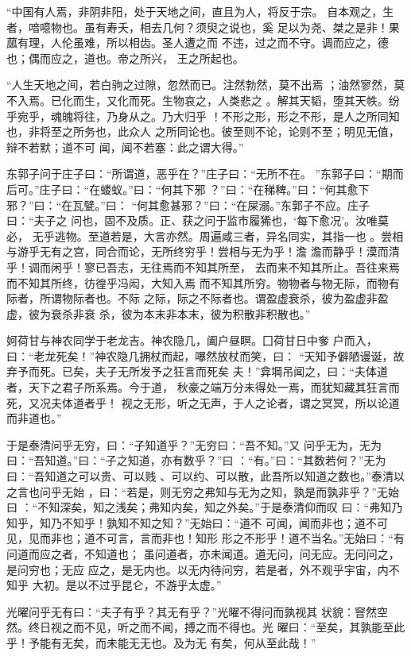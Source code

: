 \documentclass[12pt,UTF8]{ctexbook}
\begin{document}
“中国有人焉，非阴非阳，处于天地之间，直且为人，将反于宗。 自本观之，生者，喑噫物也。虽有寿夭，相去几何？须臾之说也，奚 足以为尧、桀之是非！果蓏有理，人伦虽难，所以相齿。圣人遭之而 不违，过之而不守。调而应之，德也；偶而应之，道也。帝之所兴， 王之所起也。

“人生天地之间，若白驹之过隙，忽然而已。注然勃然，莫不出焉 ；油然寥然，莫不入焉。已化而生，又化而死。生物哀之，人类悲之 。解其天韬，堕其天帙。纷乎宛乎，魂魄将往，乃身从之。乃大归乎 ！不形之形，形之不形，是人之所同知也，非将至之所务也，此众人 之所同论也。彼至则不论，论则不至；明见无值，辩不若默；道不可 闻，闻不若塞：此之谓大得。”

东郭子问于庄子曰：“所谓道，恶乎在？”庄子曰：“无所不在。 ”东郭子曰：“期而后可。”庄子曰：“在蝼蚁。”曰：“何其下邪 ？”曰：“在稊稗。”曰：“何其愈下邪？”曰：“在瓦甓。”曰： “何其愈甚邪？”曰：“在屎溺。”东郭子不应。庄子曰：“夫子之 问也，固不及质。正、获之问于监市履狶也，‘每下愈况’。汝唯莫必， 无乎逃物。至道若是，大言亦然。周遍咸三者，异名同实，其指一也 。尝相与游乎无有之宫，同合而论，无所终穷乎！尝相与无为乎！澹 澹而静乎！漠而清乎！调而闲乎！寥已吾志，无往焉而不知其所至， 去而来不知其所止。吾往来焉而不知其所终，彷徨乎冯闳，大知入焉 而不知其所穷。物物者与物无际，而物有际者，所谓物际者也。不际 之际，际之不际者也。谓盈虚衰杀，彼为盈虚非盈虚，彼为衰杀非衰 杀，彼为本末非本末，彼为积散非积散也。”

妸荷甘与神农同学于老龙吉。神农隐几，阖户昼瞑。囗荷甘日中奓 户而入，曰：“老龙死矣！”神农隐几拥杖而起，嚗然放杖而笑，曰： “天知予僻陋谩诞，故弃予而死。已矣，夫子无所发予之狂言而死矣 夫！”弇堈吊闻之，曰：“夫体道者，天下之君子所系焉。今于道， 秋豪之端万分未得处一焉，而犹知藏其狂言而死，又况夫体道者乎！ 视之无形，听之无声，于人之论者，谓之冥冥，所以论道而非道也。”

于是泰清问乎无穷，曰：“子知道乎？”无穷曰：“吾不知。”又 问乎无为，无为曰：“吾知道。”曰：“子之知道，亦有数乎？”曰 ：“有。”曰：“其数若何？”无为曰：“吾知道之可以贵、可以贱 、可以约、可以散，此吾所以知道之数也。”泰清以之言也问乎无始 ，曰：“若是，则无穷之弗知与无为之知，孰是而孰非乎？”无始曰 ：“不知深矣，知之浅矣；弗知内矣，知之外矣。”于是泰清仰而叹 曰：“弗知乃知乎，知乃不知乎！孰知不知之知？”无始曰：“道不 可闻，闻而非也；道不可见，见而非也；道不可言，言而非也！知形 形之不形乎！道不当名。”无始曰：“有问道而应之者，不知道也； 虽问道者，亦未闻道。道无问，问无应。无问问之，是问穷也；无应 应之，是无内也。以无内待问穷，若是者，外不观乎宇宙，内不知乎 大初。是以不过乎昆仑，不游乎太虚。”

光曜问乎无有曰：“夫子有乎？其无有乎？”光曜不得问而孰视其 状貌：窨然空然。终日视之而不见，听之而不闻，搏之而不得也。光 曜曰：“至矣，其孰能至此乎！予能有无矣，而未能无无也。及为无 有矣，何从至此哉！”
\end{document}

